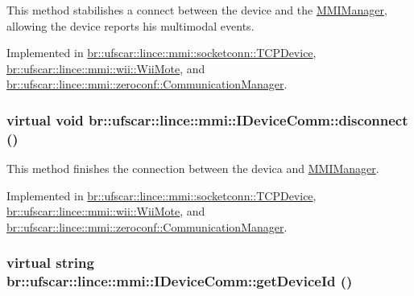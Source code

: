 This method stabilishes a connect between the device and the \hyperlink{classbr_1_1ufscar_1_1lince_1_1mmi_1_1MMIManager}{MMIManager}, allowing the device reports his multimodal events. 



Implemented in \hyperlink{classbr_1_1ufscar_1_1lince_1_1mmi_1_1socketconn_1_1TCPDevice_a2a474f7f39371460268525b0a840cd4f}{br::ufscar::lince::mmi::socketconn::TCPDevice}, \hyperlink{classbr_1_1ufscar_1_1lince_1_1mmi_1_1wii_1_1WiiMote_a15e0d1b2ac9fde887e870aeb597c0dc8}{br::ufscar::lince::mmi::wii::WiiMote}, and \hyperlink{classbr_1_1ufscar_1_1lince_1_1mmi_1_1zeroconf_1_1CommunicationManager_a580a75f652a1b1e233b6075f740555e1}{br::ufscar::lince::mmi::zeroconf::CommunicationManager}.

\hypertarget{classbr_1_1ufscar_1_1lince_1_1mmi_1_1IDeviceComm_ad3791cf1ab234f4a6b464c3f614c78c6}{
\subsubsection[{disconnect}]{\setlength{\rightskip}{0pt plus 5cm}virtual void br::ufscar::lince::mmi::IDeviceComm::disconnect ()}}
\label{classbr_1_1ufscar_1_1lince_1_1mmi_1_1IDeviceComm_ad3791cf1ab234f4a6b464c3f614c78c6}


This method finishes the connection between the devica and \hyperlink{classbr_1_1ufscar_1_1lince_1_1mmi_1_1MMIManager}{MMIManager}. 



Implemented in \hyperlink{classbr_1_1ufscar_1_1lince_1_1mmi_1_1socketconn_1_1TCPDevice_a5b1eca485752195ce49f03475229ca1f}{br::ufscar::lince::mmi::socketconn::TCPDevice}, \hyperlink{classbr_1_1ufscar_1_1lince_1_1mmi_1_1wii_1_1WiiMote_a44aa8cf98660392a91045e4892a9e65a}{br::ufscar::lince::mmi::wii::WiiMote}, and \hyperlink{classbr_1_1ufscar_1_1lince_1_1mmi_1_1zeroconf_1_1CommunicationManager_a1c41c5541bf5c02b78f3dc10a045c7f6}{br::ufscar::lince::mmi::zeroconf::CommunicationManager}.

\hypertarget{classbr_1_1ufscar_1_1lince_1_1mmi_1_1IDeviceComm_a4ae69c19445713ddc9fda351555c1ac2}{
\subsubsection[{getDeviceId}]{\setlength{\rightskip}{0pt plus 5cm}virtual string br::ufscar::lince::mmi::IDeviceComm::getDeviceId ()}}
\label{classbr_1_1ufscar_1_1lince_1_1mmi_1_1IDeviceComm_a4ae69c19445713ddc9fda351555c1ac2}


